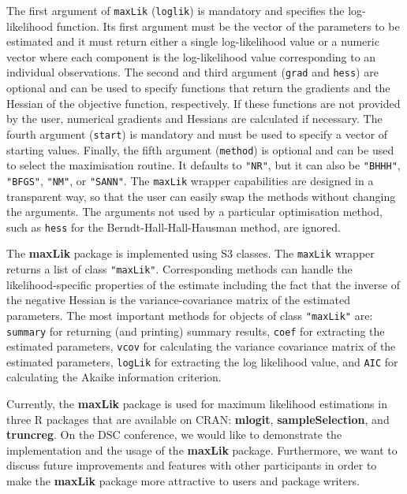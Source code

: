 \documentclass[12pt,a4paper]{article}
\newcommand{\code}[1]{\texttt{#1}}
\begin{document}
The first argument of \code{maxLik} (\code{loglik})
is mandatory and specifies the log-likelihood function.
Its first argument must be the vector of the parameters to be estimated
and it must return either a single log-likelihood value or
a numeric vector where each component is the log-likelihood value
corresponding to an individual observations.
The second and third argument (\code{grad} and \code{hess})
are optional and can be used to specify functions
that return the gradients and the Hessian of the objective function,
respectively.
If these functions are not provided by the user,
numerical gradients and Hessians are calculated if necessary.
The fourth argument (\code{start}) is mandatory and
must be used to specify a vector of starting values.
Finally, the fifth argument (\code{method}) is optional and
can be used to select the maximisation routine.
It defaults to \code{"NR"}, but it can also be \code{"BHHH"},
\code{"BFGS"}, \code{"NM"}, or \code{"SANN"}.  The \code{maxLik}
wrapper capabilities are designed in a transparent way, so that the
user can easily swap the methods without changing the
arguments.  The arguments not used by a particular optimisation
method, such as \code{hess} for the Berndt-Hall-Hall-Hausman method,
are ignored.

The \textbf{maxLik} package is implemented using S3 classes.
The \code{maxLik} wrapper returns a list of class \code{"maxLik"}.
Corresponding methods can handle the likelihood-specific properties
of the estimate including the fact
that the inverse of the negative Hessian is the variance-covariance matrix
of the estimated parameters.
The most important methods for objects of class \code{"maxLik"} are:
\code{summary} for returning (and printing) summary results,
\code{coef} for extracting the estimated parameters,
\code{vcov} for calculating the variance covariance matrix
of the estimated parameters,
\code{logLik} for extracting the log likelihood value, and
\code{AIC} for calculating the Akaike information criterion.

Currently, the \textbf{maxLik} package is used for maximum likelihood
estimations in three \textsf{R} packages that are available on CRAN:
\textbf{mlogit}, \textbf{sampleSelection},
and \textbf{truncreg}.
On the DSC conference,
we would like to demonstrate the implementation and the usage
of the \textbf{maxLik} package.
Furthermore, we want to discuss future improvements and features
with other participants
in order to make the \textbf{maxLik} package more attractive
to users and package writers.



\end{document}

